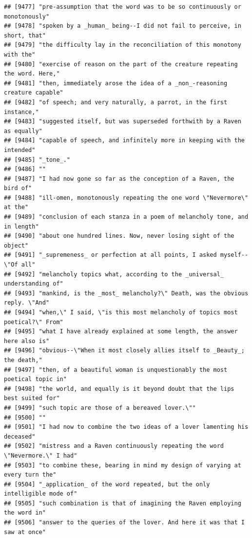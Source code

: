 \documentclass{article}\usepackage[]{graphicx}\usepackage[]{color}
\makeatletter
\newenvironment{kframe}{%
 \def\at@end@of@kframe{}%
 \ifinner\ifhmode%
  \def\at@end@of@kframe{\end{minipage}}%
  \begin{minipage}{\columnwidth}%
 \fi\fi%
 \def\FrameCommand##1{\hskip\@totalleftmargin \hskip-\fboxsep
 \colorbox{shadecolor}{##1}\hskip-\fboxsep
     \hskip-\linewidth \hskip-\@totalleftmargin \hskip\columnwidth}%
 \MakeFramed {\advance\hsize-\width
   \@totalleftmargin\z@ \linewidth\hsize
   \@setminipage}}%
 {\par\unskip\endMakeFramed%
 \at@end@of@kframe}
\newenvironment{knitrout}{}{} %
\makeatother
\begin{document}
\begin{knitrout}
\begin{kframe}
\begin{verbatim}
## [9477] "pre-assumption that the word was to be so continuously or monotonously"      
## [9478] "spoken by a _human_ being--I did not fail to perceive, in short, that"       
## [9479] "the difficulty lay in the reconciliation of this monotony with the"          
## [9480] "exercise of reason on the part of the creature repeating the word. Here,"    
## [9481] "then, immediately arose the idea of a _non_-reasoning creature capable"      
## [9482] "of speech; and very naturally, a parrot, in the first instance,"             
## [9483] "suggested itself, but was superseded forthwith by a Raven as equally"        
## [9484] "capable of speech, and infinitely more in keeping with the intended"         
## [9485] "_tone_."                                                                     
## [9486] ""                                                                            
## [9487] "I had now gone so far as the conception of a Raven, the bird of"             
## [9488] "ill-omen, monotonously repeating the one word \"Nevermore\" at the"          
## [9489] "conclusion of each stanza in a poem of melancholy tone, and in length"       
## [9490] "about one hundred lines. Now, never losing sight of the object"              
## [9491] "_supremeness_ or perfection at all points, I asked myself--\"Of all"         
## [9492] "melancholy topics what, according to the _universal_ understanding of"       
## [9493] "mankind, is the _most_ melancholy?\" Death, was the obvious reply. \"And"    
## [9494] "when,\" I said, \"is this most melancholy of topics most poetical?\" From"   
## [9495] "what I have already explained at some length, the answer here also is"       
## [9496] "obvious--\"When it most closely allies itself to _Beauty_; the death,"       
## [9497] "then, of a beautiful woman is unquestionably the most poetical topic in"     
## [9498] "the world, and equally is it beyond doubt that the lips best suited for"     
## [9499] "such topic are those of a bereaved lover.\""                                 
## [9500] ""                                                                            
## [9501] "I had now to combine the two ideas of a lover lamenting his deceased"        
## [9502] "mistress and a Raven continuously repeating the word \"Nevermore.\" I had"   
## [9503] "to combine these, bearing in mind my design of varying at every turn the"    
## [9504] "_application_ of the word repeated, but the only intelligible mode of"       
## [9505] "such combination is that of imagining the Raven employing the word in"       
## [9506] "answer to the queries of the lover. And here it was that I saw at once"      

\end{verbatim}
\end{kframe}
\end{knitrout}
\end{document}
